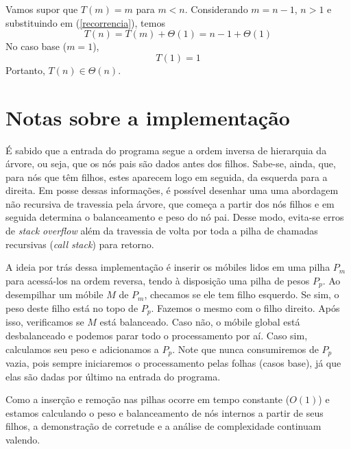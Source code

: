 \documentclass[12pt,a4paper]{article}
\begin{document}
  Vamos supor que $T(m) = m$ para $m < n$. Considerando $m = n-1$, $n > 1$ e substituindo em (\ref{recorrencia}), temos
  \begin{equation*}
    T(n) = T(m) + \Theta(1) = n-1 + \Theta(1)
  \end{equation*}
  No caso base ($m = 1$),
  \begin{equation*}
    T(1) = 1
  \end{equation*}
  Portanto, $T(n) \in \Theta(n)$.

  \section{Notas sobre a implementação}
  É sabido que a entrada do programa segue a ordem inversa de hierarquia da árvore, ou seja, que os nós pais são dados antes dos filhos. Sabe-se, ainda, que, para nós que têm filhos, estes aparecem logo em seguida, da esquerda para a direita. Em posse dessas informações, é possível desenhar uma uma abordagem não recursiva de travessia pela árvore, que começa a partir dos nós filhos e em seguida determina o balanceamento e peso do nó pai. Desse modo, evita-se erros de \emph{stack overflow} além da travessia de volta por toda a pilha de chamadas recursivas (\emph{call stack}) para retorno.

  A ideia por trás dessa implementação é inserir os móbiles lidos em uma pilha $P_m$ para acessá-los na ordem reversa, tendo à disposição uma pilha de pesos $P_p$. Ao desempilhar um móbile $M$ de $P_m$, checamos se ele tem filho esquerdo. Se sim, o peso deste filho está no topo de $P_p$. Fazemos o mesmo com o filho direito. Após isso, verificamos se $M$ está balanceado. Caso não, o móbile global está desbalanceado e podemos parar todo o processamento por aí. Caso sim, calculamos seu peso e adicionamos a $P_p$. Note que nunca consumiremos de $P_p$ vazia, pois sempre iniciaremos o processamento pelas folhas (casos base), já que elas são dadas por último na entrada do programa.

  Como a inserção e remoção nas pilhas ocorre em tempo constante ($O(1)$) e estamos calculando o peso e balanceamento de nós internos a partir de seus filhos, a demonstração de corretude e a análise de complexidade continuam valendo.
\end{document}
